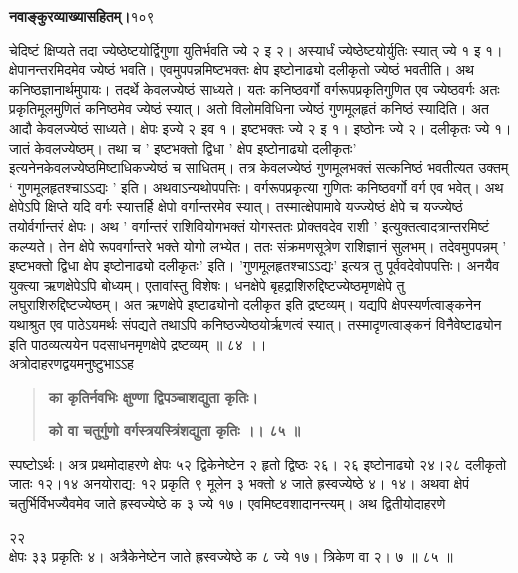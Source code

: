 \documentclass[11pt, openany]{book}
\begin{document}
\onehalfspacing
\hspace{2in}\textbf{नवाङ्कुरव्याख्यासहितम्।}\hspace{2in}१०९

\vspace{5mm}

\begin{sloppypar}
\hangindent=0.2in चेदिष्टं क्षिप्यते तदा ज्येष्ठेष्टयोर्द्विगुणा युतिर्भवति ज्ये २ इ २। अस्यार्धं ज्येष्ठेष्टयोर्युतिः स्यात् ज्ये १ इ १। क्षेपानन्तरमिदमेव ज्येष्ठं भवति। एवमुपपन्नमिष्टभक्तः क्षेप इष्टोनाढ्यो दलीकृतो ज्येष्ठं भवतीति। अथ कनिष्ठज्ञानार्थमुपायः। तदर्थे केवलज्येष्ठं साध्यते। यतः कनिष्ठवर्गो वर्गरूपप्रकृतिगुणित एव ज्येष्ठवर्गः अतः प्रकृतिमूलमुणितं कनिष्ठमेव ज्येष्ठं स्यात्। अतो विलोमविधिना ज्येष्ठं गुणमूलहृतं कनिष्ठं स्यादिति। अत आदौ केवलज्येष्ठं साध्यते। क्षेपः इज्ये २ इव १। इष्टभक्तः ज्ये २ इ १। इष्ठोनः ज्ये २। दलीकृतः ज्ये १। जातं केवलज्येष्ठम्। तथा च ' इष्टभक्तो द्विधा ' क्षेप इष्टोनाढ्यो दलीकृतः' इत्यनेनकेवलज्येष्ठमिष्टाधिकज्येष्ठं च साधितम्। तत्र केवलज्येष्ठं गुणमूलभक्तं सत्कनिष्ठं भवतीत्यत उक्तम् ` गुणमूलहृतश्चाऽऽद्यः ' इति। अथवाऽन्यथोपपत्तिः। वर्गरूपप्रकृत्या गुणितः कनिष्ठवर्गो वर्ग एव भवेत्। अथ क्षेपेऽपि क्षिप्ते यदि वर्गः स्यात्तर्हि क्षेपो वर्गान्तरमेव स्यात्। तस्मात्क्षेपामावे यज्ज्येष्ठं क्षेपे च यज्ज्येष्ठं तयोर्वर्गान्तरं क्षेपः। अथ ' वर्गान्तरं राशिवियोगभक्तं योगस्ततः प्रोक्तवदेव राशी ' इत्युक्तत्वादत्रान्तरमिष्टं कल्प्यते। तेन क्षेपे रूपवर्गान्तरे भक्ते योगो लभ्येत। ततः संक्रमणसूत्रेण राशिज्ञानं सुलभम्। तदेवमुपपन्नम् ' इष्टभक्तो द्विधा क्षेप इष्टोनाढ्यो दलीकृतः' इति। 'गुणमूलहृतश्चाऽऽद्यः' इत्यत्र तु पूर्ववदेवोपपत्तिः। अनयैव युक्त्या ऋणक्षेपेऽपि बोध्यम्। एतावांस्तु विशेषः। धनक्षेपे बृहद्राशिरुद्दिष्टज्येष्ठमृणक्षेपे तु लघुराशिरुद्दिष्टज्येष्ठम्। अत ऋणक्षेपे इष्टाढ्योनो दलीकृत इति द्रष्टव्यम्। यद्यपि क्षेपस्यर्णत्वाङ्कनेन यथाश्रुत एव पाठेऽयमर्थः संपद्यते तथाऽपि कनिष्ठज्येष्ठयोर्ऋणत्वं स्यात्। तस्मादृणत्वाङ्कनं विनैवेष्टाढ्योन इति पाठव्यत्ययेन पदसाधनमृणक्षेपे द्रष्टव्यम् ॥ ८४ ।।\\

\hangindent=0.2in \hspace{0.2in}अत्रोदाहरणद्वयमनुष्टुभाऽऽह\textendash

\begin{quote}
\hspace{0.5in}\textbf{का कृतिर्नवभिः क्षुण्णा द्विपञ्चाशद्युता कृतिः।}

\hspace{0.5in}\textbf{को वा चतुर्गुणो वर्गस्त्रयस्त्रिंशद्युता कृतिः ।। ८५ ॥}
\end{quote}

\hangindent=0.2in \hspace{0.2in}स्पष्टोऽर्थः। अत्र प्रथमोदाहरणे क्षेपः ५२ द्विकेनेष्टेन २ हृतो द्विष्ठः २६। २६ इष्टोनाढ्यो २४।२८ दलीकृतो जातः १२।१४ अनयोराद्य: १२ प्रकृति ९ मूलेन ३ भक्तो ४ जाते ह्रस्वज्येष्ठे ४। १४। अथवा क्षेपं चतुर्भिर्विभज्यैवमेव जाते ह्रस्वज्येष्ठे क ३ ज्ये १७। एवमिष्टवशादानन्त्यम्। अथ द्वितीयोदाहरणे 

\hspace{2.5in}२\hspace{0.3in}२\\

क्षेपः ३३ प्रकृतिः ४। अत्रैकेनेष्टेन जाते ह्रस्वज्येष्ठे क ८ ज्ये १७। त्रिकेण वा २। ७ ॥ ८५ ॥
\end{sloppypar}
\end{document}
